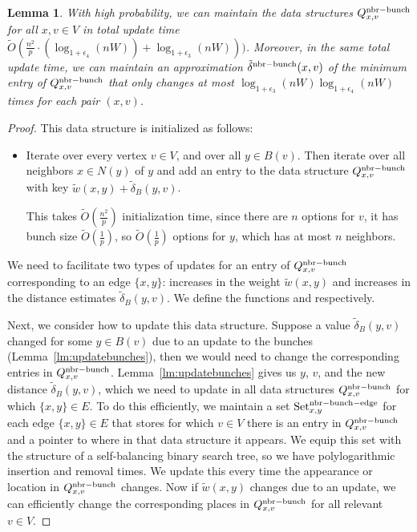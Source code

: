 \documentclass[11pt]{article}
\newtheorem{lemma}[theorem]{Lemma}
\theoremstyle{definition}
\theoremstyle{remark}
\begin{document}
\begin{titlepage}
\begin{lemma}\label{lm:NbrBunchDS}
    With high probability, we can maintain the data structures $Q^{\rm{nbr-bunch}}_{x,v}$ for all $x,v\in V$ in total update time $ \tilde O (\tfrac{n^2}{p}\cdot (\log_{1+\epsilon_4}(nW))+\log_{1+\epsilon_3}(nW))) $. Moreover, in the same total update time, we can maintain an approximation $\tilde\delta^{\rm{nbr-bunch}}(x,v)$ of the minimum entry of $Q^{\rm{nbr-bunch}}_{x,v}$ that only changes at most $\log_{1+\epsilon_3}(nW)\log_{1+\epsilon_4}(nW)$ times for each pair $(x,v)$.
\end{lemma}
\begin{proof}
    This data structure is initialized as follows:
    \begin{itemize}
        \item Iterate over every vertex $v\in V$, and over all $y\in B(v)$. Then iterate over all neighbors $x\in N(y)$ of $y$ and add an entry to the data structure $Q^{\rm{nbr-bunch}}_{x,v}$ with key $\tilde{w}(x,y) + \tilde \delta_B(y,v)$.
    
        This takes $ \tilde O (\tfrac{n^2}{p}) $ initialization time, since there are $n$ options for $v$, it has bunch size $\tilde O(\tfrac{1}{p})$, so $\tilde O(\tfrac{1}{p})$ options for $y$, which has at most $n$ neighbors. 
    \end{itemize}
    We need to facilitate two types of updates for an entry of $Q^{\rm{nbr-bunch}}_{x,v}$ corresponding to an edge $\{x,y\}$: increases in the weight $\tilde w(x,y)$ and increases in the distance estimates $\tilde\delta_B(y,v)$. We define the functions \UpdateNbrBunchDSEdgeChange and \UpdateNbrBunchDSBunchChange respectively. 
    
    Next, we consider how to update this data structure. Suppose a value $\tilde\delta_B(y,v)$ changed for some $y\in B(v)$ due to an update to the bunches (Lemma~\ref{lm:updatebunches}), then we would need to change the corresponding entries in $Q^{\rm{nbr-bunch}}_{x,v}$. Lemma~\ref{lm:updatebunches} gives us $y$, $v$, and the new distance $\tilde \delta_B(y,v)$, which we need to update in all data structures $Q^{\rm{nbr-bunch}}_{x,v}$ for which $\{x,y\}\in E$. To do this efficiently, we maintain a set $\text{Set}_{x,y}^{\rm{nbr-bunch-edge}}$ for each edge $\{x,y\}\in E$ that stores for which $v\in V$ there is an entry in $Q^{\rm{nbr-bunch}}_{x,v}$ and a pointer to where in that data structure it appears. We equip this set with the structure of a self-balancing binary search tree, so we have polylogarithmic insertion and removal times. We update this every time the appearance or location in $Q^{\rm{nbr-bunch}}_{x,v}$ changes. Now if $\tilde w(x,y)$ changes due to an update, we can efficiently change the corresponding places in $Q^{\rm{nbr-bunch}}_{x,v}$ for all relevant $v\in V$.
    

\end{proof}
\end{titlepage}
\end{document}
